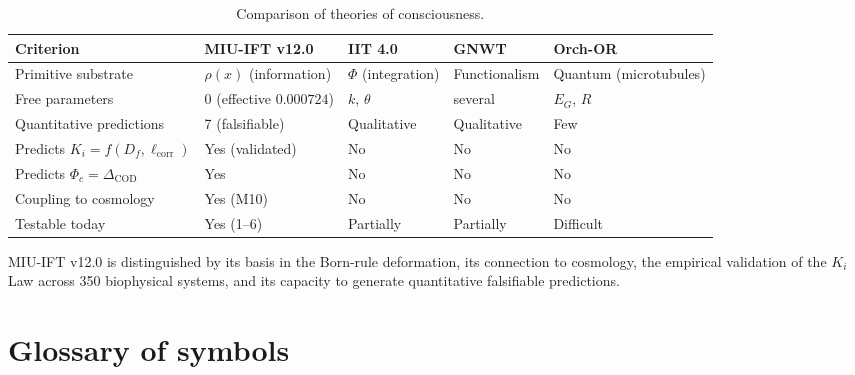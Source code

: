 \documentclass[12pt, a4paper]{article}
\theoremstyle{miuThm}
\theoremstyle{remark}
\newcommand{\eps}{0.000724}
\begin{document}
\begin{table}[h!]
\centering
\caption{Comparison of theories of consciousness.}
\label{tab:teorias}
\begin{tabular}{p{2.5cm}p{3cm}p{3cm}p{3cm}p{2.5cm}}
\toprule
\textbf{Criterion} & \textbf{MIU-IFT v12.0} & \textbf{IIT 4.0} & \textbf{GNWT} & \textbf{Orch-OR} \\
\midrule
Primitive substrate & $\rho(x)$ (information) & $\Phi$ (integration) & Functionalism & Quantum (microtubules) \\
Free parameters & 0 (effective $\eps$) & $k$, $\theta$ & several & $E_G$, $R$ \\
Quantitative predictions & 7 (falsifiable) & Qualitative & Qualitative & Few \\
Predicts $K_i = f(D_f,\ell_{\text{corr}})$ & Yes (validated) & No & No & No \\
Predicts $\Phi_c = \Delta_{\text{COD}}$ & Yes & No & No & No \\
Coupling to cosmology & Yes (M10) & No & No & No \\
Testable today & Yes (1--6) & Partially & Partially & Difficult \\
\bottomrule
\end{tabular}
\end{table}

MIU-IFT v12.0 is distinguished by its basis in the Born-rule deformation, its connection to cosmology, the empirical validation of the $K_i$ Law across 350 biophysical systems, and its capacity to generate quantitative falsifiable predictions.

\clearpage
\section{Glossary of symbols}
\end{document}

